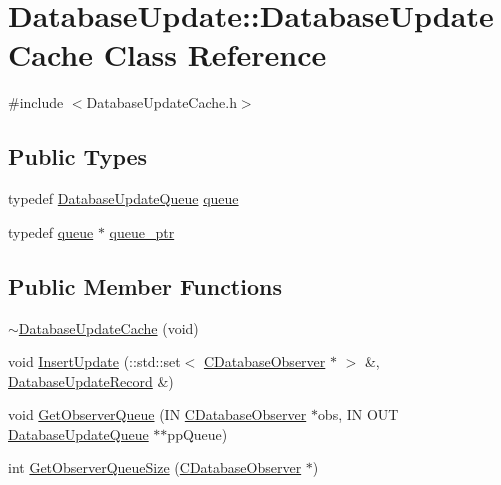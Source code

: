 \hypertarget{class_database_update_1_1_database_update_cache}{}\section{Database\+Update\+:\+:Database\+Update\+Cache Class Reference}
\label{class_database_update_1_1_database_update_cache}


{\ttfamily \#include $<$Database\+Update\+Cache.\+h$>$}

\subsection*{Public Types}
\begin{DoxyCompactItemize}
\item 
typedef \hyperlink{class_database_update_1_1_database_update_queue}{Database\+Update\+Queue} \hyperlink{class_database_update_1_1_database_update_cache_a3cde0cbb392c58f6b3e8f5ad4ac747a9}{queue}
\item 
typedef \hyperlink{class_database_update_1_1_database_update_cache_a3cde0cbb392c58f6b3e8f5ad4ac747a9}{queue} $\ast$ \hyperlink{class_database_update_1_1_database_update_cache_a529e26b49e3b31a4d5b885748524fed2}{queue\+\_\+ptr}
\end{DoxyCompactItemize}
\subsection*{Public Member Functions}
\begin{DoxyCompactItemize}
\item 
\hyperlink{class_database_update_1_1_database_update_cache_a13baccbc79529f459da1fa91e0eac2a1}{$\sim$\+Database\+Update\+Cache} (void)
\item 
void \hyperlink{class_database_update_1_1_database_update_cache_a59baef92d46c822c9f8fcabff69ec5cb}{Insert\+Update} (\+::std\+::set$<$ \hyperlink{class_c_database_observer}{C\+Database\+Observer} $\ast$ $>$ \&, \hyperlink{class_database_update_1_1_database_update_record}{Database\+Update\+Record} \&)
\item 
void \hyperlink{class_database_update_1_1_database_update_cache_a335c3b18733a6a06512557ac66fa106f}{Get\+Observer\+Queue} (I\+N \hyperlink{class_c_database_observer}{C\+Database\+Observer} $\ast$obs, I\+N O\+U\+T \hyperlink{class_database_update_1_1_database_update_queue}{Database\+Update\+Queue} $\ast$$\ast$pp\+Queue)
\item 
int \hyperlink{class_database_update_1_1_database_update_cache_ab2665a1a4db7b8ac4b89cd686cfbcc19}{Get\+Observer\+Queue\+Size} (\hyperlink{class_c_database_observer}{C\+Database\+Observer} $\ast$)
\end{DoxyCompactItemize}
